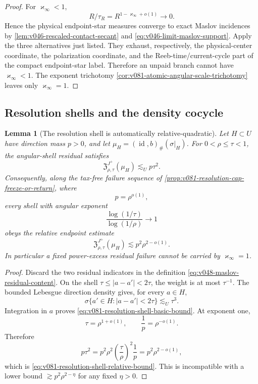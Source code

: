 \documentclass[10pt]{article}
\newtheorem{lemma}[theorem]{Lemma}
\newcommand{\id}{\operatorname{id}}
\begin{document}
\begin{proof}
For \(\varkappa_\infty<1\),
\[
R/\tau_R=R^{1-\varkappa_\infty+o(1)}\to0.
\]
Hence the physical endpoint-star measures converge to exact Maslov incidences by
\cref{lem:v046-rescaled-contact-secant} and
\eqref{eq:v046-limit-maslov-support}.  Apply the three alternatives just listed.  They exhaust,
respectively, the physical-center coordinate, the polarization coordinate, and the
Reeb-time/current-cycle part of the compact endpoint-star label.  Therefore an unpaid branch cannot
have \(\varkappa_\infty<1\).  The exponent trichotomy
\cref{cor:v081-atomic-angular-scale-trichotomy} leaves only
\(\varkappa_\infty=1\).
\end{proof}

\subsection{Resolution shells and the density cocycle}

\begin{lemma}[The resolution shell is automatically relative-quadratic]
\label{lem:v081-resolution-shell-relative-quadratic}
Let \(H\subset U\) have direction mass \(p>0\), and let
\(\mu_H=(\id,b)_\#(\sigma|_H)\).  For \(0<\rho\le\tau<1\), the angular-shell residual satisfies
\begin{equation}
\label{eq:v081-resolution-shell-basic-bound}
\boxed{
\mathfrak Z_{\rho,\tau}^{J^+}(\mu_H)
\lesssim_U
p\tau^2.
}
\end{equation}
Consequently, along the tax-free failure sequence of
\cref{prop:v081-resolution-cap-freeze-or-return}, where
\[
p=\rho^{o(1)},
\]
every shell with angular exponent
\[
\frac{\log(1/\tau)}{\log(1/\rho)}\longrightarrow1
\]
obeys the relative endpoint estimate
\begin{equation}
\label{eq:v081-resolution-shell-relative-bound}
\boxed{
\mathfrak Z_{\rho,\tau}^{J^+}(\mu_H)
\lesssim
p^2\rho^{2-o(1)}.
}
\end{equation}
In particular a fixed power-excess residual failure cannot be carried by
\(\varkappa_\infty=1\).
\end{lemma}

\begin{proof}
Discard the two residual indicators in the definition
\eqref{eq:v048-maslov-residual-content}.  On the shell
\(\tau\le|a-a'|<2\tau\), the weight is at most \(\tau^{-1}\).  The bounded Lebesgue direction
density gives, for every \(a\in H\),
\[
\sigma\{a'\in H:|a-a'|<2\tau\}
\lesssim_U\tau^3.
\]
Integration in \(a\) proves
\eqref{eq:v081-resolution-shell-basic-bound}.  At exponent one,
\[
\tau=\rho^{1+o(1)},
\qquad
\frac1p=\rho^{-o(1)}.
\]
Therefore
\[
p\tau^2
=
p^2\rho^2
\left(\frac{\tau}{\rho}\right)^2\frac1p
=
p^2\rho^{2-o(1)},
\]
which is \eqref{eq:v081-resolution-shell-relative-bound}.  This is incompatible with a lower bound
\(\gtrsim p^2\rho^{2-\eta}\) for any fixed \(\eta>0\).
\end{proof}
\end{document}
